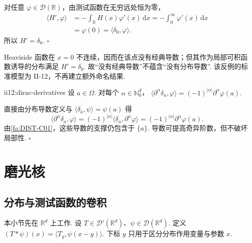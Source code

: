 \begin{FAProof}
对任意 \(\displaystyle\varphi\in\mathcal D(\mathbb R)\)，由测试函数在无穷远处恒为零，
\[
\begin{aligned}
\langle H',\varphi\rangle
&=-\int_{\mathbb R}H(x)\varphi'(x)\,\mathrm{d}x
=-\int_0^\infty\varphi'(x)\,\mathrm{d}x\\
&=\varphi(0)=\langle\delta_0,\varphi\rangle.
\end{aligned}
\]
所以 \(\displaystyle H'=\delta_0\).
\hfill\(\square\)
\end{FAProof}

\begin{FACounterexample}[无经典导数但有分布导数]
Heaviside 函数在 \(\displaystyle x=0\) 不连续，因而在该点没有经典导数；但其作为局部可积函数诱导的分布满足 \(\displaystyle H'=\delta_0.\)
故“没有经典导数”不蕴含“没有分布导数”. 该反例的标准模型为 II-12，不再建立额外命名结果.
\end{FACounterexample}

\begin{FAProposition}[B][Dirac的任意阶分布导数]{ii12:dirac-derivatives}
设 \(\displaystyle a\in\Omega\). 对每个 \(\displaystyle\alpha\in\mathbb N_0^d\)， \(\displaystyle \langle\partial^\alpha\delta_a,\varphi\rangle = (-1)^{|\alpha|}\partial^\alpha\varphi(a).\)
\end{FAProposition}

\begin{FAProof}
直接由分布导数定义与 \(\displaystyle\langle\delta_a,\psi\rangle=\psi(a)\) 得
\[
\langle\partial^\alpha\delta_a,\varphi\rangle
=
(-1)^{|\alpha|}\langle\delta_a,\partial^\alpha\varphi\rangle
=
(-1)^{|\alpha|}\partial^\alpha\varphi(a).
\]
由\autoref{fa:DIST-C01}，这些导数的支撑仍包含于 \(\displaystyle\{a\}\). 导数可提高奇异阶数，但不破坏局部性.
\hfill\(\square\)
\end{FAProof}

\section{磨光核}\label{sec:ii12-mollifiers}

\subsection{分布与测试函数的卷积}

本小节先在 \(\displaystyle\mathbb R^d\) 上工作. 设 \(\displaystyle T\in\mathcal D'(\mathbb R^d)\)、\(\displaystyle\psi\in\mathcal D(\mathbb R^d)\). 定义 \(\displaystyle (T*\psi)(x) = \langle T_y,\psi(x-y)\rangle.\)
下标 \(\displaystyle y\) 只用于区分分布作用变量与参数 \(\displaystyle x\).

